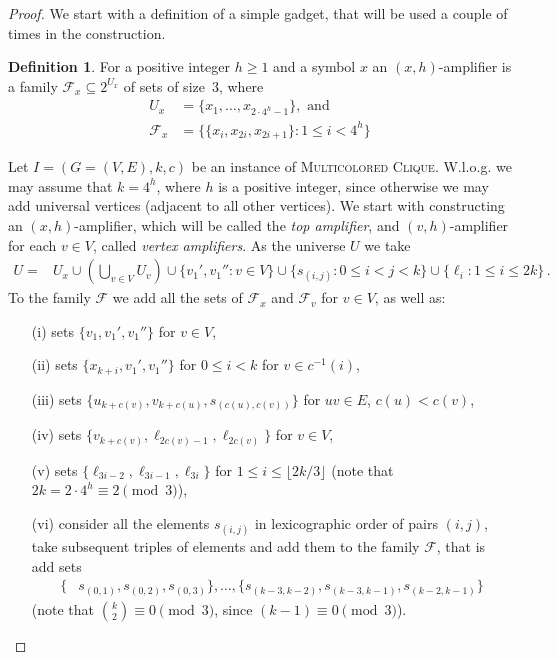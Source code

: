 \documentclass[11pt]{article}
\theoremstyle{definition}
\newtheorem{definition}[theorem]{Definition}
\newcommand{\cF}{{\mathcal{F}}}
\newcommand{\MC}{{\textsc{Multicolored Clique}}\xspace}
\begin{document}
\begin{proof}
We start with a definition of a simple gadget, that will be used a couple of times
in the construction.
\begin{definition}
For a positive integer $h \ge 1$ and a symbol $x$ an $(x,h)$-amplifier is a family $\cF_x \subseteq 2^{U_x}$ of sets of size~$3$, where 
\begin{align*}
U_x & = \{x_1,\ldots,x_{2\cdot 4^h-1}\}, \textrm{ and} \\
\cF_x & = \{\{x_i,x_{2i},x_{2i+1}\} : 1 \le i < 4^h\}
\end{align*}
\end{definition}

Let $I=(G=(V,E),k,c)$ be an instance of \MC.
W.l.o.g. we may assume that $k=4^h$, where $h$ is a positive integer,
since otherwise we may add universal vertices (adjacent to all other vertices).
We start with constructing an $(x,h)$-amplifier, which will
be called the {\em top amplifier},
and $(v,h)$-amplifier for each $v \in V$, called {\em vertex amplifiers}.
As the universe $U$ we take
\begin{align*}
U = & U_x \cup (\bigcup_{v \in V} U_v) \cup \{v_1', v_1'' : v \in V\} \cup \{s_{(i,j)} : 0 \le i < j < k\} \cup \{\ell_{i} : 1 \le i \le 2k\}\,.
\end{align*}
To the family $\cF$ we add all the sets of $\cF_x$ and $\cF_v$ for $v \in V$, as well as:
\begin{itemize}
  \item[(i)] sets $\{v_1, v_1', v_1''\}$ for $v \in V$,
  \item[(ii)] sets $\{x_{k+i},v_1',v_1''\}$ for $0 \le i < k$ for $v \in c^{-1}(i)$,
  \item[(iii)] sets $\{u_{k+c(v)}, v_{k+c(u)}, s_{(c(u),c(v))}\}$ for $uv \in E$, $c(u) < c(v)$,
  \item[(iv)] sets $\{v_{k+c(v)}, \ell_{2c(v)-1}, \ell_{2c(v)}\}$ for $v \in V$,
  \item[(v)] sets $\{\ell_{3i-2}, \ell_{3i-1}, \ell_{3i}\}$ for $1 \le i \le \lfloor 2k/3 \rfloor$ (note that $2k = 2 \cdot 4^h \equiv 2 \pmod 3$),
  \item[(vi)] consider all the elements $s_{(i,j)}$ in lexicographic order of pairs $(i,j)$,
  take subsequent triples of elements and add them to the family $\cF$, that is
  add sets 
  \begin{align*}
  \{&s_{(0,1)}, s_{(0,2)}, s_{(0,3)}\},\ldots, \{s_{(k-3,k-2)}, s_{(k-3,k-1)}, s_{(k-2,k-1)}\}
  \end{align*}
  (note that $\binom{k}{2} \equiv 0 \pmod 3$, since $(k-1) \equiv 0 \pmod 3$).
\end{itemize}


\end{proof}
\end{document}
